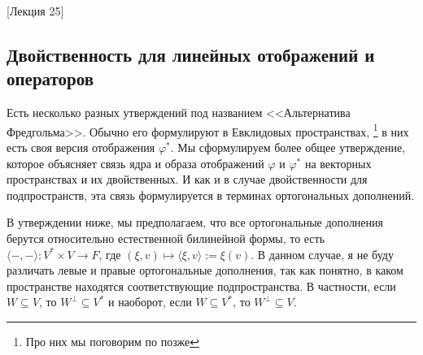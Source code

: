 [Лекция 25]


\subsection{Двойственность для линейных отображений и операторов}

Есть несколько разных утверждений под названием <<Альтернатива Фредгольма>>.
Обычно его формулируют в Евклидовых пространствах,%
\footnote{Про них мы поговорим по позже}
в них есть своя версия отображения $\varphi^*$.
Мы сформулируем более общее утверждение, которое объясняет связь ядра и образа отображений $\varphi$ и $\varphi^*$ на векторных пространствах и их двойственных.
И как и в случае двойственности для подпространств, эта связь формулируется в терминах ортогональных дополнений.

В утверждении ниже, мы предполагаем, что все ортогональные дополнения берутся относительно естественной билинейной формы, то есть $\langle{-}, {-}\rangle\colon V^*\times V\to F$, где $(\xi, v)\mapsto \langle \xi, v\rangle := \xi(v)$.
В данном случае, я не буду различать левые и правые ортогональные дополнения, так как понятно, в каком пространстве находятся соответствующие подпространства.
В частности, если $W\subseteq V$, то $W^\bot\subseteq V^*$ и наоборот, если $W\subseteq V^*$, то $W^\bot \subseteq V$.

